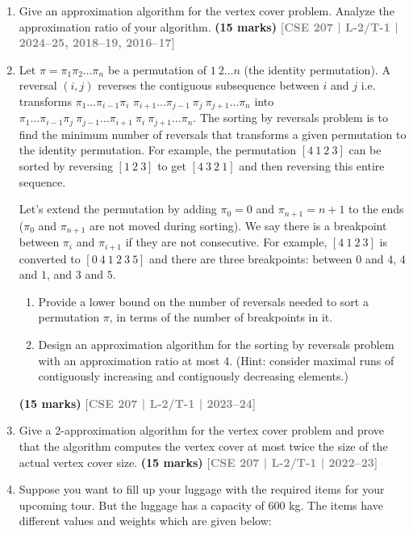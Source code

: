 \documentclass[12pt]{article}
\newcommand{\yr}[1]{\hfill\textcolor{gray}{\small\textbf{[#1]}}}
\newcommand{\mk}[1]{\textcolor{orange!70!black}{\small\textbf{(#1 marks)}}}
\begin{document}
\begin{enumerate}

\item Give an approximation algorithm for the vertex cover problem. Analyze the approximation ratio of your algorithm.
\mk{15} \yr{CSE 207 | L-2/T-1 | 2024--25, 2018--19, 2016--17}


\item Let $\pi = \pi_1 \pi_2 \dots \pi_n$ be a permutation of $1\ 2 \dots n$ (the identity permutation). A reversal 
$(i, j)$ reverses the contiguous subsequence between $i$ and $j$ i.e. transforms $\pi_1 \dots \pi_{i-1}\pi_i$ 
$\pi_{i+1} \dots \pi_{j-1}\ \pi_j\ \pi_{j+1} \dots \pi_{n}$ into $\pi_1 \dots \pi_{i-1}\pi_j\ \pi_{j-1} \dots \pi_{i+1}\ \pi_i\ \pi_{j+1} \dots \pi_n$. The sorting by 
reversals problem is to find the minimum number of reversals that transforms a given 
permutation to the identity permutation. For example, the permutation $[4\ 1\ 2\ 3]$ can be 
sorted by reversing $[1\ 2\ 3]$ to get $[4\ 3\ 2\ 1]$ and then reversing this entire sequence.

Let's extend the permutation by adding $\pi_0 = 0$ and $\pi_{n+1} = n + 1$ to the ends ($\pi_0$ and $\pi_{n+1}$ 
are not moved during sorting). We say there is a breakpoint between $\pi_i$ and $\pi_{i+1}$ if they 
are not consecutive. For example, $[4\ 1\ 2\ 3]$ is converted to $[0\ 4\ 1\ 2\ 3\ 5]$ and there are 
three breakpoints: between $0$ and $4$, $4$ and $1$, and $3$ and $5$.
\begin{enumerate}
  \item Provide a lower bound on the number of reversals needed to sort a permutation $\pi$, in terms of the number of breakpoints in it.
  \item Design an approximation algorithm for the sorting by reversals problem with an approximation ratio at most 4. (Hint: consider maximal runs of contiguously increasing and contiguously decreasing elements.)
\end{enumerate}
\mk{15} \yr{CSE 207 | L-2/T-1 | 2023--24}


\item Give a 2-approximation algorithm for the vertex cover problem and prove that the algorithm computes the vertex cover at most twice the size of the actual vertex cover size.
\mk{15} \yr{CSE 207 | L-2/T-1 | 2022--23}


\item Suppose you want to fill up your luggage with the required items for your upcoming 
tour. But the luggage has a capacity of 600 kg. The items have different values and 
weights which are given below:


\end{enumerate}
\end{document}
